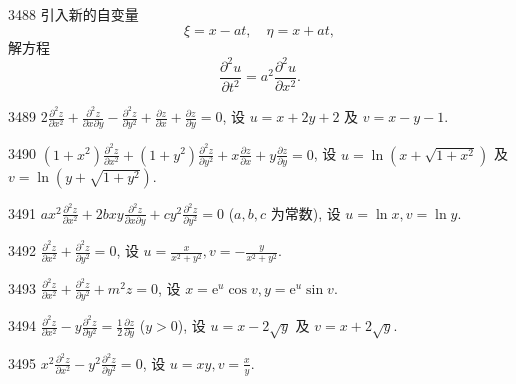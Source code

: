 \begin{prob}[M]{3488}
引入新的自变量
\[
\xi = x - at, \quad \eta = x + at,
\]
解方程
\[
\frac{\partial^2 u}{\partial t^2} = a^2\frac{\partial^2 u}{\partial x^2}.
\]
\end{prob}


\begin{prob}[S]{3489}
$2\frac{\partial^2 z}{\partial x^2} + \frac{\partial^2 z}{\partial x\partial y} - \frac{\partial^2 z}{\partial y^2} + \frac{\partial z}{\partial x} + \frac{\partial z}{\partial y} = 0$, 设 $u = x + 2y + 2$ 及 $v = x - y - 1$.
\end{prob}

\begin{prob}[S]{3490}
$(1+x^2)\frac{\partial^2 z}{\partial x^2} + (1+y^2)\frac{\partial^2 z}{\partial y^2} + x\frac{\partial z}{\partial x} + y\frac{\partial z}{\partial y} = 0$, 设 $u = \ln(x+\sqrt{1+x^2})$ 及 $v = \ln(y+\sqrt{1+y^2})$.
\end{prob}

\begin{prob}[S]{3491}
$ax^2\frac{\partial^2 z}{\partial x^2} + 2bxy\frac{\partial^2 z}{\partial x\partial y} + cy^2\frac{\partial^2 z}{\partial y^2} = 0$ ($a, b, c$ 为常数), 设 $u = \ln x, v = \ln y$.
\end{prob}

\begin{prob}[S]{3492}
$\frac{\partial^2 z}{\partial x^2} + \frac{\partial^2 z}{\partial y^2} = 0$, 设 $u = \frac{x}{x^2+y^2}, v = -\frac{y}{x^2+y^2}$.
\end{prob}

\begin{prob}[S]{3493}
$\frac{\partial^2 z}{\partial x^2} + \frac{\partial^2 z}{\partial y^2} + m^2 z = 0$, 设 $x = \mathrm{e}^u\cos v, y = \mathrm{e}^u\sin v$.
\end{prob}

\begin{prob}[S]{3494}
$\frac{\partial^2 z}{\partial x^2} - y\frac{\partial^2 z}{\partial y^2} = \frac{1}{2}\frac{\partial z}{\partial y}$ ($y > 0$), 设 $u = x - 2\sqrt{y}$ 及 $v = x + 2\sqrt{y}$.
\end{prob}

\begin{prob}[S]{3495}
$x^2\frac{\partial^2 z}{\partial x^2} - y^2\frac{\partial^2 z}{\partial y^2} = 0$, 设 $u = xy, v = \frac{x}{y}$.
\end{prob}

